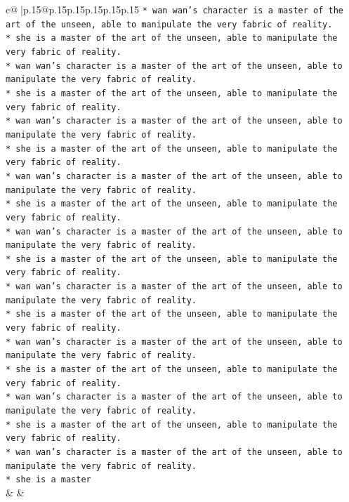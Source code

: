 \documentclass{article}
\begin{document}
{\begin{supertabular}{c@{$\;$}|p{.15\linewidth}@{}p{.15\linewidth}p{.15\linewidth}p{.15\linewidth}p{.15\linewidth}p{.15\linewidth}}
{{{\texttt{* wan wan's character is a master of the art of the unseen, able to manipulate the very fabric of reality.} \\
\texttt{* she is a master of the art of the unseen, able to manipulate the very fabric of reality.} \\
\texttt{* wan wan's character is a master of the art of the unseen, able to manipulate the very fabric of reality.} \\
\texttt{* she is a master of the art of the unseen, able to manipulate the very fabric of reality.} \\
\texttt{* wan wan's character is a master of the art of the unseen, able to manipulate the very fabric of reality.} \\
\texttt{* she is a master of the art of the unseen, able to manipulate the very fabric of reality.} \\
\texttt{* wan wan's character is a master of the art of the unseen, able to manipulate the very fabric of reality.} \\
\texttt{* she is a master of the art of the unseen, able to manipulate the very fabric of reality.} \\
\texttt{* wan wan's character is a master of the art of the unseen, able to manipulate the very fabric of reality.} \\
\texttt{* she is a master of the art of the unseen, able to manipulate the very fabric of reality.} \\
\texttt{* wan wan's character is a master of the art of the unseen, able to manipulate the very fabric of reality.} \\
\texttt{* she is a master of the art of the unseen, able to manipulate the very fabric of reality.} \\
\texttt{* wan wan's character is a master of the art of the unseen, able to manipulate the very fabric of reality.} \\
\texttt{* she is a master of the art of the unseen, able to manipulate the very fabric of reality.} \\
\texttt{* wan wan's character is a master of the art of the unseen, able to manipulate the very fabric of reality.} \\
\texttt{* she is a master of the art of the unseen, able to manipulate the very fabric of reality.} \\
\texttt{* wan wan's character is a master of the art of the unseen, able to manipulate the very fabric of reality.} \\
\texttt{* she is a master} \\
            }
        }
    }
    & & \\ \\


\end{supertabular}}
\end{document}
